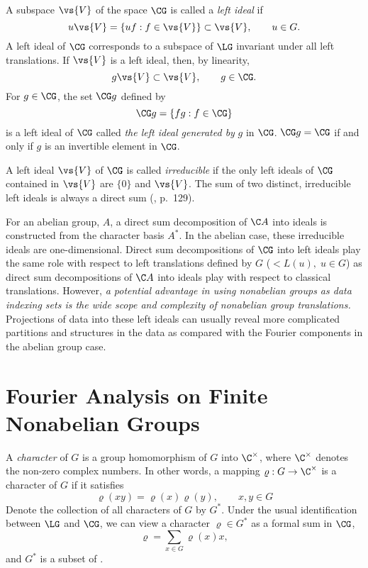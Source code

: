 A subspace $\vs{V}$ of the space $\CG$ is called a \emph{left ideal} if
\[
u\vs{V} = \{uf : f \in \vs{V}\} \subset \vs{V}, \qquad u \in G. 
\]
A left ideal of $\CG$ corresponds to a subspace of $\LG$ invariant under all
left translations.  If $\vs{V}$ is a left ideal, then, by linearity,
\[
g\vs{V} \subset \vs{V}, \qquad g \in \CG.
\]
For $g\in \CG$, the set $\CG g$ defined by 
\[
\CG g = \{fg : f \in \CG\}
\]
is a left ideal of $\CG$ called \emph{the left ideal generated by} $g$ in $\CG$.
$\CG g = \CG$ if and only if $g$ is an invertible element in $\CG$.

A left ideal $\vs{V}$ of $\CG$ is called \emph{irreducible} if the only left ideals
of $\CG$ contained in $\vs{V}$ are $\{0\}$ and $\vs{V}$. The sum of two distinct,
irreducible left ideals is always a direct sum (\cite{An:2003}, p.~129).

For an abelian group, $A$, a direct sum decomposition of $\C A$
into ideals is constructed from the character basis
$A^*$. In the abelian case, these irreducible ideals are one-dimensional.
Direct sum decompositions of $\CG$ into left ideals play the same
role with respect to left translations defined by $G$ (\ie $\lt{L}(u), \;u \in G$)
as direct sum decompositions of $\C A$ into ideals play with respect to
classical translations.   However, \emph{a potential advantage in using
  nonabelian groups as data indexing sets is the wide scope and complexity of
  nonabelian group translations.}  
Projections of data into these left ideals
can usually reveal more complicated partitions and structures in the data as
compared with the Fourier components in the abelian group case.

\section{Fourier Analysis on Finite Nonabelian Groups}
A \emph{character} of $G$ is a group homomorphism of $G$ into $\C^{\times}$,
where $\C^{\times}$ denotes the non-zero complex numbers.
In other words, a mapping $\varrho: G \to \C^{\times}$ is a character of
$G$ if it satisfies 
\[
\varrho(xy) = \varrho(x)\varrho(y), \qquad x, y \in G
\]
Denote the collection of all characters of $G$ by $G^*$.  Under the usual
identification between $\LG$ and $\CG$, we can view a character $\varrho \in G^*$
as a formal sum in $\CG$, 
\begin{equation}\label{eq:GFIP-formal-sum}
\varrho = \sum_{x\in G}\varrho(x)x,
\end{equation}
and $G^*$ is a subset of \CG.

